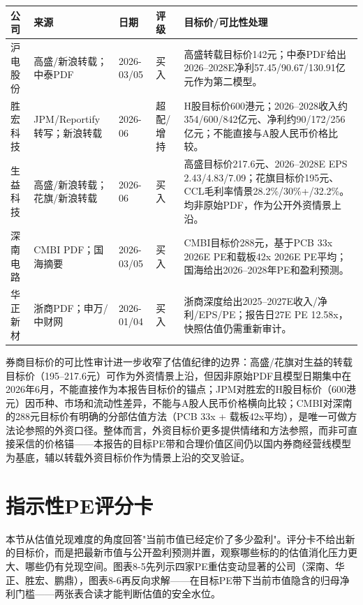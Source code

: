 \begin{exhibitbox}[图表8-4：券商目标价和可比性审计]
\footnotesize
\begin{tabularx}{\textwidth}{L{2cm}L{2.1cm}L{1.8cm}L{1.7cm}X}
\toprule
\textbf{公司} & \textbf{来源} & \textbf{日期} & \textbf{评级} & \textbf{目标价/可比性处理} \\
\midrule
沪电股份 & 高盛/新浪转载；中泰PDF & 2026-03/05 & 买入 & 高盛转载目标价142元；中泰PDF给出2026--2028E净利57.45/90.67/130.91亿元作为第二模型。 \\
胜宏科技 & JPM/Reportify转写；新浪转载 & 2026-06 & 超配/增持 & H股目标价600港元；2026--2028收入约354/600/842亿元、净利约90/172/256亿元；不能直接与A股人民币价格比较。 \\
生益科技 & 高盛/新浪转载；花旗/新浪转载 & 2026-06 & 买入 & 高盛目标价217.6元、2026--2028E EPS 2.43/4.83/7.09；花旗目标价195元、CCL毛利率情景28.2\%/30\%+/32.2\%。均非原始PDF，作为公开外资情景上沿。 \\
深南电路 & CMBI PDF；国海摘要 & 2026-03/05 & 买入 & CMBI目标价288元，基于PCB 33x 2026E PE和载板42x 2026E PE平均；国海给出2026--2028年PE和盈利预测。 \\
华正新材 & 浙商PDF；申万/中财网 & 2026-01/04 & 买入 & 浙商深度给出2025--2027E收入/净利/EPS/PE；报告日27E PE 12.58x，快照估值仍需重新审计。 \\
\bottomrule
\end{tabularx}
\end{exhibitbox}

券商目标价的可比性审计进一步收窄了估值纪律的边界：高盛/花旗对生益的转载目标价（195--217.6元）可作为外资情景上沿，但因非原始PDF且模型日期集中在2026年6月，不能直接作为本报告目标价的锚点；JPM对胜宏的H股目标价（600港元）因币种、市场和流动性差异，不能与A股人民币价格横向比较；CMBI对深南的288元目标价有明确的分部估值方法（PCB 33x + 载板42x平均），是唯一可做方法论参照的外资口径。整体而言，外资目标价更多提供情绪和方法参照，而非可直接采信的价格锚——本报告的目标PE带和合理价值区间仍以国内券商经营线模型为基底，辅以转载外资目标价作为情景上沿的交叉验证。

\section{指示性PE评分卡}

本节从估值兑现难度的角度回答"当前市值已经定价了多少盈利"。评分卡不给出新的目标价，而是把最新市值与公开盈利预测并置，观察哪些标的的估值消化压力更大、哪些仍有兑现空间。图表8-5先列示四家PE重估变动显著的公司（深南、华正、胜宏、鹏鼎），图表8-6再反向求解——在目标PE带下当前市值隐含的归母净利门槛——两张表合读才能判断估值的安全水位。

